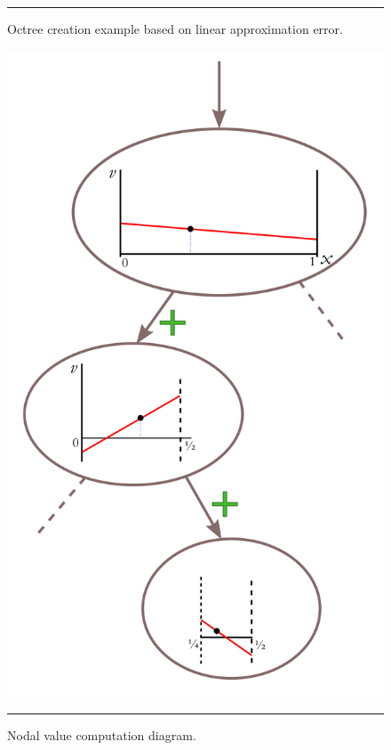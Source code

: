 \begin{figure}[!tbp]
\begin{minipage}[b]{0.4\textwidth}
    \rule{\textwidth}{.4pt}
    \captionsetup{width=\linewidth}
    \caption[Octree creation]{Octree creation example based on linear approximation error.}
    \label{fig:octree-creation}
  \end{minipage}
  \hfill
  \begin{minipage}[b]{0.4\textwidth}
    \includegraphics[width=\textwidth]{figures/chapter-approximation/figure6}
    \rule{\textwidth}{.4pt}
    \captionsetup{width=\linewidth}
    \caption[Nodal value computation]{Nodal value computation diagram.}
    \label{fig:nodal-value-computation}
  \end{minipage}
\end{figure}

